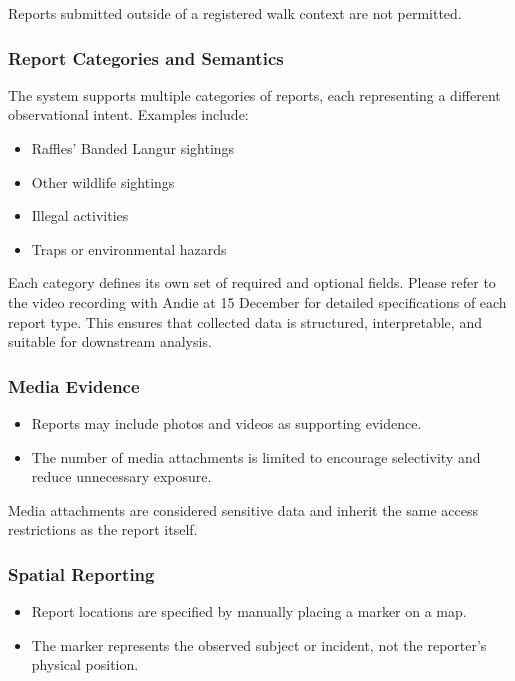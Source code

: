 \documentclass[11pt]{article}
\begin{document}
Reports submitted outside of a registered walk context are not permitted.

\subsubsection{Report Categories and Semantics}

The system supports multiple categories of reports, each representing a different observational intent.
Examples include:
\begin{itemize}
    \item Raffles' Banded Langur sightings
    \item Other wildlife sightings
    \item Illegal activities
    \item Traps or environmental hazards
\end{itemize}

Each category defines its own set of required and optional fields. Please refer to the video recording with Andie at 15 December for detailed specifications of each report type.
This ensures that collected data is structured, interpretable, and suitable for downstream analysis.

\subsubsection{Media Evidence}

\begin{itemize}
    \item Reports may include photos and videos as supporting evidence.
    \item The number of media attachments is limited to encourage selectivity and reduce unnecessary exposure.
\end{itemize}

Media attachments are considered sensitive data and inherit the same access restrictions as the report itself.

\subsubsection{Spatial Reporting}

\begin{itemize}
    \item Report locations are specified by manually placing a marker on a map.
    \item The marker represents the observed subject or incident, not the reporter’s physical position.
\end{itemize}
\end{document}
